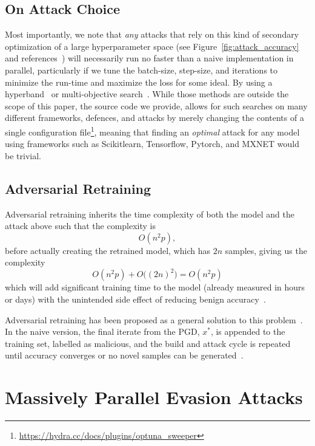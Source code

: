 \documentclass[runningheads]{llncs}
\begin{document}
\subsection{On Attack Choice}

Most importantly, we note that \textit{any} attacks that rely on this kind of secondary optimization of a large hyperparameter space (see Figure~\ref{fig:attack_accuracy} and references~\cite{su2019one,carlini2017towards,chen2020hopskipjumpattack,brown2017adversarial,brendel2017decision,croce2020reliable,liu2018dpatch,qin2019imperceptible,grosse2018limitations,kotyan2019adversarial,chen2017zoo}) will necessarily run no faster than a naive implementation in parallel, particularly if we tune the batch-size, step-size, and iterations to minimize the run-time and maximize the loss for some ideal. By using a hyperband~\cite{li2017hyperband} or multi-objective search~\cite{hansen2016cma,ozaki2022multiobjective}. While those methods are outside the scope of this paper, the source code we provide, allows for such searches on many different frameworks, defences, and attacks by merely changing the contents of a single configuration file\footnote{\href{https://hydra.cc/docs/plugins/optuna_sweeper/}{https://hydra.cc/docs/plugins/optuna\_sweeper}}, meaning that finding an \textit{optimal} attack for any model using frameworks such as Scikitlearn, Tensorflow, Pytorch, and MXNET would be trivial.

\subsection{Adversarial Retraining}
\label{retrain}
Adversarial retraining inherits the time complexity of both the model and the attack above such that the complexity is
$$
    O(n^2p),
$$
before actually creating the retrained model, which has $2n$ samples, giving us the complexity
$$
    O(n^2p) + O\big((2n)^2\big) = O(n^2p)
$$
which will add significant training time to the model (already measured in hours or days) with the unintended side effect of reducing benign accuracy~\cite{stutz2019confidence}.

Adversarial retraining has been proposed as a general solution to this problem~\cite{li2016general,stutz2019confidence}. In the naive version, the final iterate from the PGD, $x^{*}$, is appended to the training set, labelled as malicious, and the build and attack cycle is repeated until accuracy converges or no novel samples can be generated~\cite{li2016general}.

\section{Massively Parallel Evasion Attacks}
\end{document}
